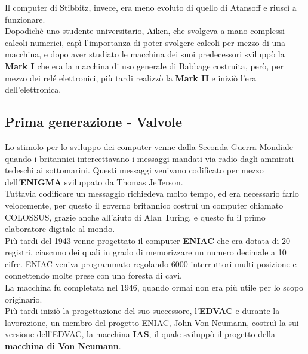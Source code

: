 \documentclass[12pt]{report}
\begin{document}
		Il computer di Stibbitz, invece, era meno evoluto di quello di Atansoff e riuscì a funzionare. \\
		Dopodichè uno studente universitario, Aiken, che svolgeva a mano complessi calcoli numerici, capì l'importanza di poter svolgere calcoli per mezzo di una macchina, e dopo aver studiato le macchina dei suoi predecessori sviluppò la \textbf{Mark I} che era la macchina di uso generale di Babbage costruita, però, per mezzo dei relé elettronici, più tardi realizzò la \textbf{Mark II} e iniziò l'era dell'elettronica.
		\subsection{Prima generazione - Valvole}
		Lo stimolo per lo sviluppo dei computer venne dalla Seconda Guerra Mondiale quando i britannici intercettavano i messaggi mandati via radio dagli ammirati tedeschi ai sottomarini. Questi messaggi venivano codificato per mezzo dell'\textbf{ENIGMA} sviluppato da Thomas Jefferson. \\
		Tuttavia codificare un messaggio richiedeva molto tempo, ed era necessario farlo velocemente, per questo il governo britannico costruì un computer chiamato COLOSSUS, grazie anche all'aiuto di Alan Turing, e questo fu il primo elaboratore digitale al mondo. \\
		Più tardi del 1943 venne progettato il computer \textbf{ENIAC} che era dotata di 20 registri, ciascuno dei quali in grado di memorizzare un numero decimale a 10 cifre. ENIAC veniva programmato regolando 6000 interruttori multi-posizione e connettendo molte prese con una foresta di cavi. \\
		La macchina fu completata nel 1946, quando ormai non era più utile per lo scopo originario. \\
		Più tardi iniziò la progettazione del suo successore, l'\textbf{EDVAC} e durante la lavorazione, un membro del progetto ENIAC, John Von Neumann, costruì la sui versione dell'EDVAC, la macchina \textbf{IAS}, il quale sviluppò il progetto della \textbf{macchina di Von Neumann}.
\end{document}
